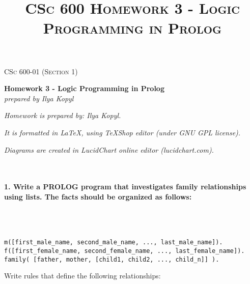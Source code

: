\documentclass{article}
\begin{document}
	\setlength{\grammarparsep}{5pt plus 1pt minus 1pt} %
	\setlength{\grammarindent}{13em} %




	\begin{titlepage}
		\begin{center}
				\Large\textsc{CSc 600-01 (Section 1)}
				
				\Large\textbf{Homework 3 - Logic Programming in Prolog}\\

				\Large\textit{prepared by Ilya Kopyl}
				
		\end{center}	
	\end{titlepage}


	\title{\textsc{CSc 600 Homework 3 - Logic Programming in Prolog}}	
	\maketitle
	
		\textit{Homework is prepared by: Ilya Kopyl.}

		\textit{It is formatted in LaTeX, using TeXShop editor (under GNU GPL license).}
		
		\textit{Diagrams are created in LucidChart online editor (lucidchart.com).}

	\rmfamily\




	\paragraph{1. Write a PROLOG program that investigates family relationships using lists. The facts should be organized as follows:}\
	\rmfamily\\\
	
	\ttfamily
	\begin{verbatim} 
m([first_male_name, second_male_name, ..., last_male_name]).
f([first_female_name, second_female_name, ..., last_female_name]).
family( [father, mother, [child1, child2, ..., child_n]] ).
	\end{verbatim}
	
	\rmfamily
	Write rules that define the following relationships:
	
\end{document}
